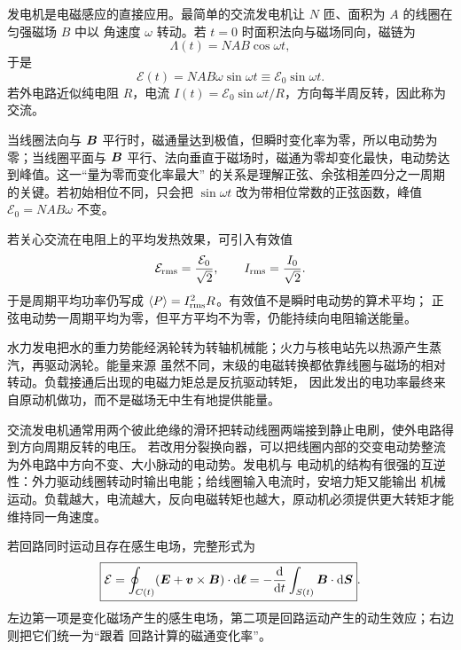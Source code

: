 {发电机是电磁感应的直接应用。最简单的交流发电机让 $N$ 匝、面积为 $A$ 的线圈在匀强磁场 $B$ 中以
角速度 $\omega$ 转动。若 $t=0$ 时面积法向与磁场同向，磁链为
\begin{equation}
  \Lambda(t)=NAB\cos\omega t,
\end{equation}
于是
\begin{equation}
  \boxed{\mathcal E(t)=NAB\omega\sin\omega t
  \equiv\mathcal E_0\sin\omega t}.
\end{equation}
若外电路近似纯电阻 $R$，电流 $I(t)=\mathcal E_0\sin\omega t/R$，方向每半周反转，因此称为交流。

当线圈法向与 $\bm{B}$ 平行时，磁通量达到极值，但瞬时变化率为零，所以电动势为零；当线圈平面与
$\bm{B}$ 平行、法向垂直于磁场时，磁通为零却变化最快，电动势达到峰值。这一“量为零而变化率最大”
的关系是理解正弦、余弦相差四分之一周期的关键。若初始相位不同，只会把
$\sin\omega t$ 改为带相位常数的正弦函数，峰值 $\mathcal E_0=NAB\omega$ 不变。

若关心交流在电阻上的平均发热效果，可引入有效值
\begin{equation}
  \mathcal E_{\rm rms}=\frac{\mathcal E_0}{\sqrt2},
  \qquad I_{\rm rms}=\frac{I_0}{\sqrt2}.
\end{equation}
于是周期平均功率仍写成 $\langle P\rangle=I_{\rm rms}^2R$。有效值不是瞬时电动势的算术平均；
正弦电动势一周期平均为零，但平方平均不为零，仍能持续向电阻输送能量。

\generatorFigureFaithful

水力发电把水的重力势能经涡轮转为转轴机械能；火力与核电站先以热源产生蒸汽，再驱动涡轮。能量来源
虽然不同，末级的电磁转换都依靠线圈与磁场的相对转动。负载接通后出现的电磁力矩总是反抗驱动转矩，
因此发出的电功率最终来自原动机做功，而不是磁场无中生有地提供能量。

交流发电机通常用两个彼此绝缘的滑环把转动线圈两端接到静止电刷，使外电路得到方向周期反转的电压。
若改用分裂换向器，可以把线圈内部的交变电动势整流为外电路中方向不变、大小脉动的电动势。发电机与
电动机的结构有很强的互逆性：外力驱动线圈转动时输出电能；给线圈输入电流时，安培力矩又能输出
机械运动。负载越大，电流越大，反向电磁转矩也越大，原动机必须提供更大转矩才能维持同一角速度。

若回路同时运动且存在感生电场，完整形式为
\begin{equation}
  \boxed{\mathcal E=\oint_{C(t)}(\bm{E}+\bm{v}\times\bm{B})\cdot\mathop{}\!\mathrm d\bm{\ell}
  =-\frac{\mathop{}\!\mathrm d}{\mathop{}\!\mathrm d t}\int_{S(t)}\bm{B}\cdot\mathop{}\!\mathrm d\bm{S}}.
\end{equation}
左边第一项是变化磁场产生的感生电场，第二项是回路运动产生的动生效应；右边则把它们统一为“跟着
回路计算的磁通变化率”。

}

